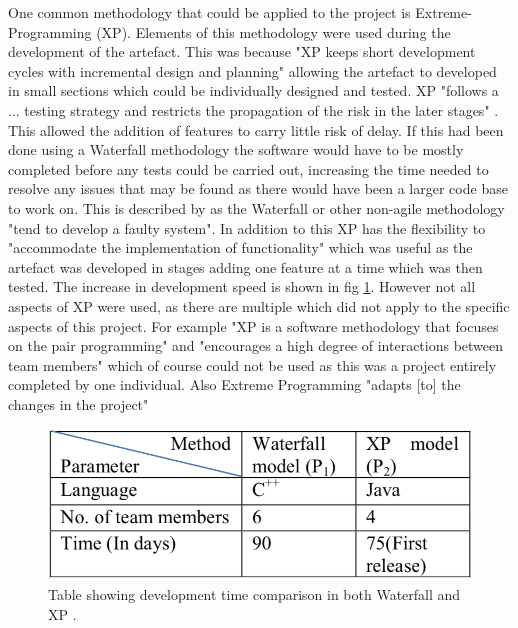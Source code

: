 \documentclass[11pt,a4paper]{report}
\begin{document}
One common methodology that could be applied to the project is Extreme-Programming (XP). Elements of this methodology were used during the development of the artefact. This was because "XP keeps short development cycles with incremental design and planning" \citep{XPsharma2016analysis} allowing the artefact to developed in small sections which could be individually designed and tested. XP "follows a ... testing strategy and restricts the propagation of the risk in the later stages" \citep{XPsharma2016analysis}. This allowed the addition of features to carry little risk of delay. If this had been done using a Waterfall methodology the software would have to be mostly completed before any tests could be carried out, increasing the time needed to resolve any issues that may be found as there would have been a larger code base to work on. This is described by \cite{XPsharma2016analysis} as the Waterfall or other non-agile methodology "tend to develop a faulty system". In addition to this XP has the flexibility to "accommodate the implementation of functionality" \citep{XPsharma2016analysis} which was useful as the artefact was developed in stages adding one feature at a time which was then tested. The increase in development speed is shown in fig \ref{fig:XPvsWater}. However not all aspects of XP were used, as there are multiple which did not apply to the specific aspects of this project. For example "XP is a software methodology that focuses on the pair programming" and "encourages a high degree of interactions between team members" \citep{XPsharma2016analysis} which of course could not be used as this was a project entirely completed by one individual. Also Extreme Programming "adapts [to] the changes in the project"

\begin{figure}[H]
 \centering
 \includegraphics[scale = 0.45]{XP_vs_Waterfall.png}
 \caption{Table showing development time comparison in both Waterfall and XP  \citep{XPsharma2016analysis}.}
 \label{fig:XPvsWater}
\end{figure}
\end{document}
